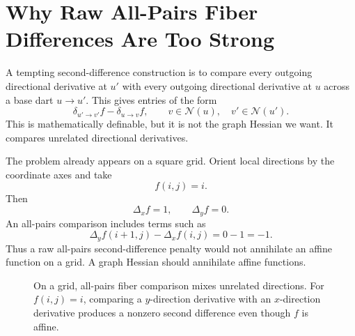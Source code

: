 \documentclass[11pt]{article}
\newcommand{\N}{\mathcal N}
\begin{document}
\section{Why Raw All-Pairs Fiber Differences Are Too Strong}

A tempting second-difference construction is to compare every outgoing
directional derivative at \(u'\) with every outgoing directional derivative at
\(u\) across a base dart \(u\to u'\).  This gives entries of the form
\[
  \delta_{u'\to v'}f-\delta_{u\to v}f,
  \qquad
  v\in\N(u),\quad v'\in\N(u').
\]
This is mathematically definable, but it is not the graph Hessian we want.  It
compares unrelated directional derivatives.

The problem already appears on a square grid.  Orient local directions by the
coordinate axes and take
\[
  f(i,j)=i.
\]
Then
\[
  \Delta_x f = 1,
  \qquad
  \Delta_y f = 0.
\]
An all-pairs comparison includes terms such as
\[
  \Delta_y f(i+1,j)-\Delta_x f(i,j)=0-1=-1.
\]
Thus a raw all-pairs second-difference penalty would not annihilate an affine
function on a grid.  A graph Hessian should annihilate affine functions.

\begin{figure}[ht]
\centering
{}
\caption{On a grid, all-pairs fiber comparison mixes unrelated directions.
For \(f(i,j)=i\), comparing a \(y\)-direction derivative with an \(x\)-direction
derivative produces a nonzero second difference even though \(f\) is affine.}
\end{figure}
\end{document}
